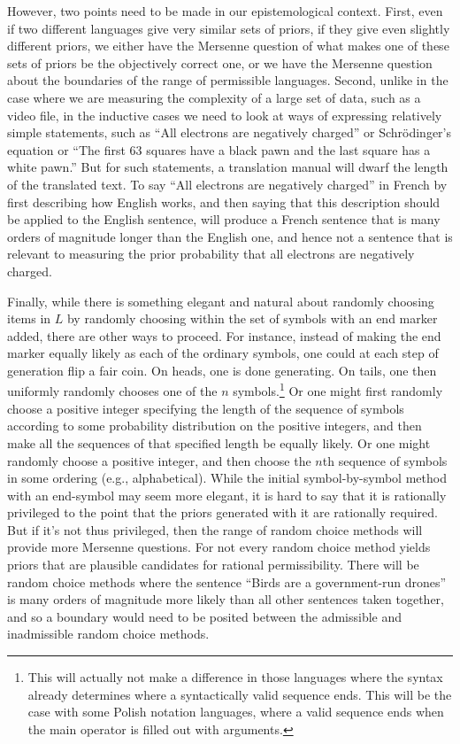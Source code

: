 However, two points need to be made in our epistemological context. First, even if two different languages give very similar sets of priors, 
if they give even slightly different priors, we either have the Mersenne question of what makes one of these sets of priors be the 
objectively correct one, or we have the Mersenne question about the boundaries of the range of permissible languages. Second,
unlike in the case where we are measuring the complexity of a large set of data, such as a video file, in the inductive cases we 
need to look at ways of expressing relatively simple statements, such as ``All electrons are negatively charged'' or 
Schr\"odinger's equation or ``The first 63 squares have a black pawn and the last square has a white pawn.'' But for such statements, 
a translation manual will dwarf the length of the translated text. To say ``All electrons are negatively charged'' in French by first describing how English works, and then saying that this
description should be applied to the English sentence, will produce a French sentence that is many orders of magnitude longer
than the English one, and hence not a sentence that is relevant to measuring the prior probability that all electrons are negatively
charged.

Finally, while there is something elegant and natural about randomly choosing items in $L$ by randomly choosing within the
set of symbols with an end marker added, there are other ways to proceed. For instance, instead of making the end marker
equally likely as each of the ordinary symbols, one could at each step of generation flip a fair coin. On heads, one is done
generating. On tails, one then uniformly randomly chooses one of the $n$ symbols.\footnote{This will actually not make a 
difference in those languages where the syntax already determines where a syntactically valid sequence ends. This will be the
case with some Polish notation languages, where a valid sequence ends when the main operator is filled out with arguments.}
Or one might first randomly choose a positive integer specifying the length of the sequence of symbols according to some
probability distribution on the positive integers, and then make all the sequences of that specified length be equally likely. 
Or one might randomly choose a positive integer, and then choose the $n$th sequence of symbols in some ordering (e.g., alphabetical).
While the initial symbol-by-symbol method with an end-symbol may seem more elegant, it is hard to say that it is rationally
privileged to the point that the priors generated with it are rationally required. But if it's not thus privileged, then the
range of random choice methods will provide more Mersenne questions. For not every random choice method yields priors that
are plausible candidates for rational permissibility. There will be random choice methods where the sentence ``Birds are a government-run 
drones'' is many orders of magnitude more likely than all other sentences taken together, and so a boundary would need to be
posited between the admissible and inadmissible random choice methods.

